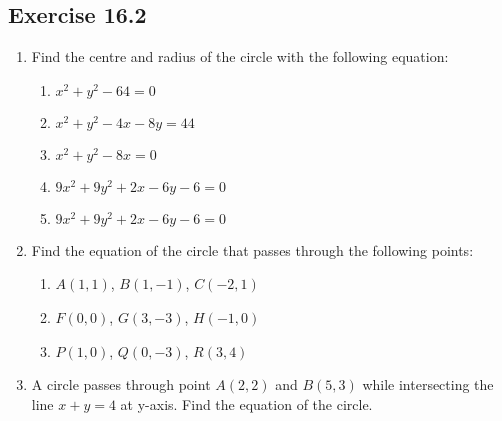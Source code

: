 \documentclass{report}
\begin{document}
\begin{multicols}{2}
    \subsection{Exercise 16.2}

    \begin{enumerate}
        \item Find the centre and radius of the circle with the following equation:
              \begin{enumerate}
                  \item $x^2+y^2-64=0$
                  \item $x^2+y^2-4x-8y=44$
                  \item $x^2+y^2-8x=0$
                  \item $9x^2+9y^2+2x-6y-6=0$
                  \item $9x^2+9y^2+2x-6y-6=0$
              \end{enumerate}
        \item Find the equation of the circle that passes through the following points:
              \begin{enumerate}
                  \item $A(1, 1)$, $B(1, -1)$, $C(-2, 1)$
                  \item $F(0, 0)$, $G(3, -3)$, $H(-1, 0)$
                  \item $P(1, 0)$, $Q(0, -3)$, $R(3, 4)$
              \end{enumerate}
        \item A circle passes through point $A(2, 2)$ and $B(5, 3)$ while intersecting the
              line $x+y=4$ at y-axis. Find the equation of the circle.
    \end{enumerate}

\end{multicols}
\end{document}
